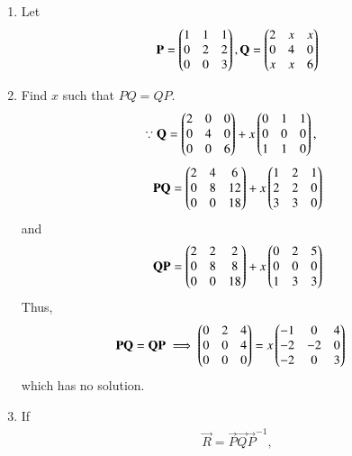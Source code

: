 \renewcommand{\theequation}{\theenumi}
\begin{enumerate}[label=\arabic*.,ref=\thesubsection.\theenumi]

\item Let 
\begin{align}
\mathbf{P} = \begin{pmatrix}1 & 1 & 1 \\ 0 & 2 & 2 \\ 0 & 0 & 3\end{pmatrix}, 
\mathbf{Q} = \begin{pmatrix}2 & x & x \\ 0 & 4 & 0 \\ x & x & 6\end{pmatrix}
\label{eq:2019_qp2_2_q}
\end{align}
%

\item Find $x$ such that $PQ=QP$.
%
\\
\solution 
\begin{align}
\because \mathbf{Q} &= \begin{pmatrix}2 & 0 & 0 \\ 0 & 4 & 0 \\ 0 & 0 & 6\end{pmatrix} +x\begin{pmatrix}0 & 1 & 1 \\ 0 & 0 & 0 \\ 1 & 1 & 0\end{pmatrix}, 
\end{align}
\begin{align}
\mathbf{P}\mathbf{Q} = 
 \begin{pmatrix}2 & 4 & 6 \\ 0 & 8 & 12 \\ 0 & 0 & 18\end{pmatrix}+x\begin{pmatrix}1 & 2 & 1 \\ 2 & 2 & 0 \\ 3 & 3 & 0\end{pmatrix}
\end{align}
and 
\begin{multline}
\mathbf{Q}\mathbf{P} = 
\begin{pmatrix}2 & 2 & 2 \\ 0 & 8 & 8 \\ 0 & 0 & 18\end{pmatrix}+x\begin{pmatrix}0 & 2 & 5 \\ 0 & 0 & 0 \\ 1 & 3 & 3\end{pmatrix} 
\end{multline}
%
Thus, 
\begin{align}
\mathbf{P}\mathbf{Q} = \mathbf{Q}\mathbf{P} 
\implies 
\begin{pmatrix}0 & 2 & 4 \\ 0 & 0 & 4 \\ 0 & 0 & 0\end{pmatrix} &= x\begin{pmatrix}-1 & 0 & 4 \\ -2 & -2 & 0 \\ -2 & 0 & 3\end{pmatrix}
\end{align}
which has no solution.
\item If 
\begin{align}
\vec{R} = \vec{P}\vec{Q}\vec{P}^{-1},
\end{align}

\end{enumerate}
